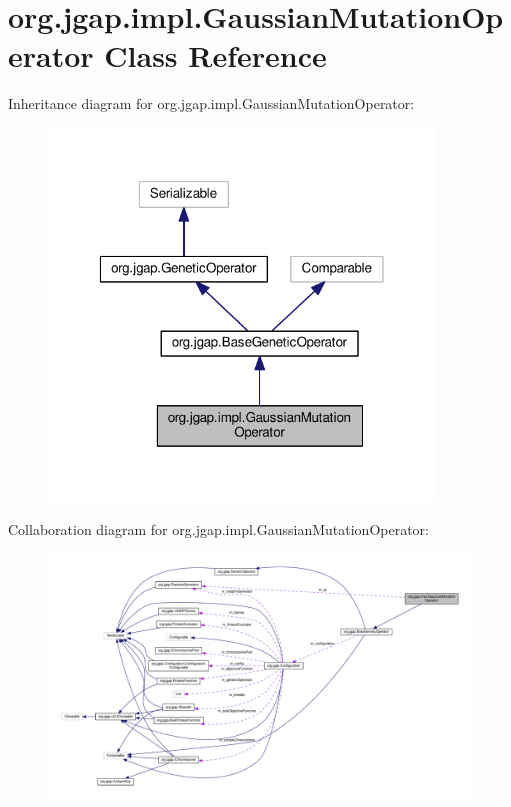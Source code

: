 \hypertarget{classorg_1_1jgap_1_1impl_1_1_gaussian_mutation_operator}{\section{org.\-jgap.\-impl.\-Gaussian\-Mutation\-Operator Class Reference}
\label{classorg_1_1jgap_1_1impl_1_1_gaussian_mutation_operator}
}


Inheritance diagram for org.\-jgap.\-impl.\-Gaussian\-Mutation\-Operator\-:
\nopagebreak
\begin{figure}[H]
\begin{center}
\leavevmode
\includegraphics[width=291pt]{classorg_1_1jgap_1_1impl_1_1_gaussian_mutation_operator__inherit__graph}
\end{center}
\end{figure}


Collaboration diagram for org.\-jgap.\-impl.\-Gaussian\-Mutation\-Operator\-:
\nopagebreak
\begin{figure}[H]
\begin{center}
\leavevmode
\includegraphics[width=350pt]{classorg_1_1jgap_1_1impl_1_1_gaussian_mutation_operator__coll__graph}
\end{center}
\end{figure}
